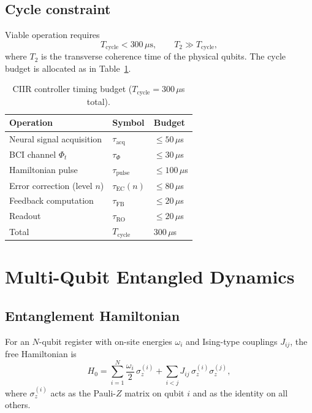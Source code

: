 \subsection{Cycle constraint}

Viable operation requires
\begin{equation}\label{eq:cycle-constraint}
  T_{\mathrm{cycle}} < 300\,\mu\text{s},
  \qquad
  T_2 \gg T_{\mathrm{cycle}},
\end{equation}
where $T_2$ is the transverse coherence time of the physical qubits.
The cycle budget is allocated as in Table~\ref{tab:timing}.

\begin{table}[ht]
\centering
\caption{CIIR controller timing budget ($T_{\mathrm{cycle}} = 300\,\mu$s total).}
\label{tab:timing}
\begin{tabular}{lll}
\toprule
\textbf{Operation} & \textbf{Symbol} & \textbf{Budget} \\
\midrule
Neural signal acquisition & $\tau_{\mathrm{acq}}$ & $\leq 50\,\mu$s \\
BCI channel $\Phi_t$       & $\tau_{\Phi}$         & $\leq 30\,\mu$s \\
Hamiltonian pulse          & $\tau_{\mathrm{pulse}}$ & $\leq 100\,\mu$s \\
Error correction (level $n$) & $\tau_{\mathrm{EC}}(n)$ & $\leq 80\,\mu$s \\
Feedback computation       & $\tau_{\mathrm{FB}}$   & $\leq 20\,\mu$s \\
Readout                    & $\tau_{\mathrm{RO}}$   & $\leq 20\,\mu$s \\
\midrule
Total                      & $T_{\mathrm{cycle}}$   & $300\,\mu$s \\
\bottomrule
\end{tabular}
\end{table}

\section{Multi-Qubit Entangled Dynamics}
\label{sec:ch21-entangled}

\subsection{Entanglement Hamiltonian}

For an $N$-qubit register with on-site energies $\omega_i$ and
Ising-type couplings $J_{ij}$, the free Hamiltonian is
\begin{equation}\label{eq:H-free}
  H_0 = \sum_{i=1}^{N} \frac{\omega_i}{2}\,\sigma_z^{(i)}
        + \sum_{i < j} J_{ij}\,\sigma_z^{(i)}\sigma_z^{(j)},
\end{equation}
where $\sigma_z^{(i)}$ acts as the Pauli-$Z$ matrix on qubit $i$ and as
the identity on all others.

